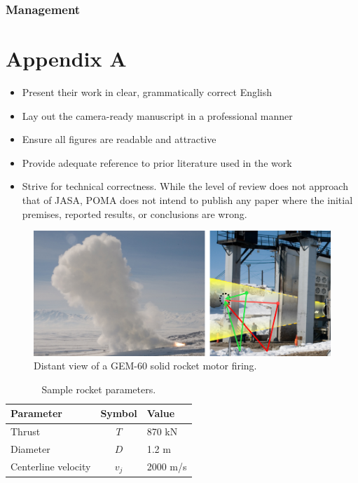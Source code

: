 \documentclass[12pt,letter]{article}
\begin{document}
    \subsubsection{Management}

\appendix

\section*{Appendix A}

\begin{itemize}
	\item Present their work in clear, grammatically correct English
	\item Lay out the camera-ready manuscript in a professional manner
	\item Ensure all figures are readable and attractive
	\item Provide adequate reference to prior literature used in the work
	\item Strive for technical correctness. While the level of review does not approach that of JASA, POMA does not intend to publish any paper where the initial premises, reported results, or conclusions are wrong. 
\end{itemize}

\begin{figure}
	\centering
	\includegraphics{GEM60_Picture}
	\caption{\label{fig:gem60}Distant view of a GEM-60 solid rocket motor firing.}
\end{figure}

\begin{table}
	\centering
	\caption{\label{tab:rocket}Sample rocket parameters.}
\begin{tabular}{lcl}
	\textbf{Parameter} & \textbf{Symbol} & \textbf{Value} \\ \hline
	Thrust & $T$ & 870 kN \\
	Diameter & $D$ & 1.2 m \\
	Centerline velocity & $v_j$ & 2000 m/s
\end{tabular}
\end{table}
\end{document}
